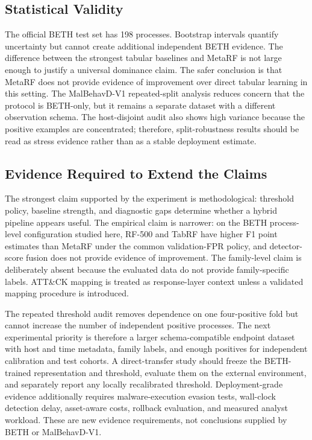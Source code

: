 \documentclass[10pt,journal,compsoc]{IEEEtran}
\begin{document}
\subsection{Statistical Validity}

The official BETH test set has 198 processes. Bootstrap intervals quantify uncertainty but cannot create additional independent BETH evidence. The difference between the strongest tabular baselines and MetaRF is not large enough to justify a universal dominance claim. The safer conclusion is that MetaRF does not provide evidence of improvement over direct tabular learning in this setting. The MalBehavD-V1 repeated-split analysis reduces concern that the protocol is BETH-only, but it remains a separate dataset with a different observation schema. The host-disjoint audit also shows high variance because the positive examples are concentrated; therefore, split-robustness results should be read as stress evidence rather than as a stable deployment estimate.

\subsection{Evidence Required to Extend the Claims}
\label{sec:recommendations}

The strongest claim supported by the experiment is methodological: threshold policy, baseline strength, and diagnostic gaps determine whether a hybrid pipeline appears useful. The empirical claim is narrower: on the BETH process-level configuration studied here, RF-500 and TabRF have higher F1 point estimates than MetaRF under the common validation-FPR policy, and detector-score fusion does not provide evidence of improvement. The family-level claim is deliberately absent because the evaluated data do not provide family-specific labels. ATT\&CK mapping is treated as response-layer context unless a validated mapping procedure is introduced.

The repeated threshold audit removes dependence on one four-positive fold but cannot increase the number of independent positive processes. The next experimental priority is therefore a larger schema-compatible endpoint dataset with host and time metadata, family labels, and enough positives for independent calibration and test cohorts. A direct-transfer study should freeze the BETH-trained representation and threshold, evaluate them on the external environment, and separately report any locally recalibrated threshold. Deployment-grade evidence additionally requires malware-execution evasion tests, wall-clock detection delay, asset-aware costs, rollback evaluation, and measured analyst workload. These are new evidence requirements, not conclusions supplied by BETH or MalBehavD-V1.
\end{document}
